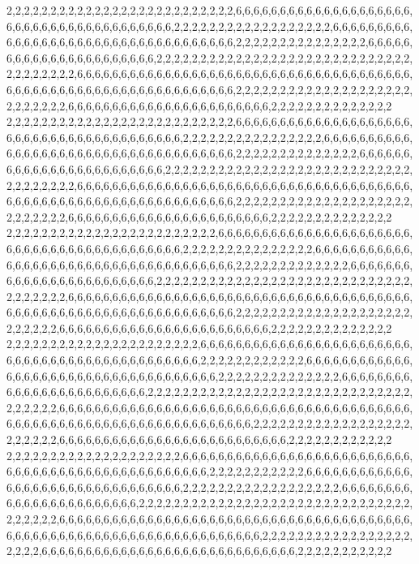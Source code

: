2,2,2,2,2,2,2,2,2,2,2,2,2,2,2,2,2,2,2,2,2,2,2,2,2,2,6,6,6,6,6,6,6,6,6,6,6,6,6,6,6,6,6,6,6,6,6,6,6,6,6,6,6,6,6,6,6,6,6,6,6,6,6,6,6,2,2,2,2,2,2,2,2,2,2,2,2,2,2,2,2,2,2,6,6,6,6,6,6,6,6,6,6,6,6,6,6,6,6,6,6,6,6,6,6,6,6,6,6,6,6,6,6,6,6,6,6,6,2,2,2,2,2,2,2,2,2,2,2,2,2,2,2,6,6,6,6,6,6,6,6,6,6,6,6,6,6,6,6,6,6,6,6,6,6,2,2,2,2,2,2,2,2,2,2,2,2,2,2,2,2,2,2,2,2,2,2,2,2,2,2,2,2,2,2,2,2,2,2,2,2,2,6,6,6,6,6,6,6,6,6,6,6,6,6,6,6,6,6,6,6,6,6,6,6,6,6,6,6,6,6,6,6,6,6,6,6,6,6,6,6,6,6,6,6,6,6,6,6,6,6,6,6,6,6,6,6,6,6,6,6,6,6,6,6,6,2,2,2,2,2,2,2,2,2,2,2,2,2,2,2,2,2,2,2,2,2,2,2,2,2,2,2,6,6,6,6,6,6,6,6,6,6,6,6,6,6,6,6,6,6,6,6,6,6,6,2,2,2,2,2,2,2,2,2,2,2,2,2,2
2,2,2,2,2,2,2,2,2,2,2,2,2,2,2,2,2,2,2,2,2,2,2,2,2,2,6,6,6,6,6,6,6,6,6,6,6,6,6,6,6,6,6,6,6,6,6,6,6,6,6,6,6,6,6,6,6,6,6,6,6,6,6,6,6,6,2,2,2,2,2,2,2,2,2,2,2,2,2,2,2,2,6,6,6,6,6,6,6,6,6,6,6,6,6,6,6,6,6,6,6,6,6,6,6,6,6,6,6,6,6,6,6,6,6,6,6,6,2,2,2,2,2,2,2,2,2,2,2,2,2,2,6,6,6,6,6,6,6,6,6,6,6,6,6,6,6,6,6,6,6,6,6,6,6,6,2,2,2,2,2,2,2,2,2,2,2,2,2,2,2,2,2,2,2,2,2,2,2,2,2,2,2,2,2,2,2,2,2,2,2,2,6,6,6,6,6,6,6,6,6,6,6,6,6,6,6,6,6,6,6,6,6,6,6,6,6,6,6,6,6,6,6,6,6,6,6,6,6,6,6,6,6,6,6,6,6,6,6,6,6,6,6,6,6,6,6,6,6,6,6,6,6,6,6,6,2,2,2,2,2,2,2,2,2,2,2,2,2,2,2,2,2,2,2,2,2,2,2,2,2,2,2,6,6,6,6,6,6,6,6,6,6,6,6,6,6,6,6,6,6,6,6,6,6,6,2,2,2,2,2,2,2,2,2,2,2,2,2,2
2,2,2,2,2,2,2,2,2,2,2,2,2,2,2,2,2,2,2,2,2,2,2,2,6,6,6,6,6,6,6,6,6,6,6,6,6,6,6,6,6,6,6,6,6,6,6,6,6,6,6,6,6,6,6,6,6,6,6,6,6,6,6,6,6,6,2,2,2,2,2,2,2,2,2,2,2,2,2,2,2,6,6,6,6,6,6,6,6,6,6,6,6,6,6,6,6,6,6,6,6,6,6,6,6,6,6,6,6,6,6,6,6,6,6,6,6,6,2,2,2,2,2,2,2,2,2,2,2,2,2,6,6,6,6,6,6,6,6,6,6,6,6,6,6,6,6,6,6,6,6,6,6,6,6,2,2,2,2,2,2,2,2,2,2,2,2,2,2,2,2,2,2,2,2,2,2,2,2,2,2,2,2,2,2,2,2,2,2,2,2,6,6,6,6,6,6,6,6,6,6,6,6,6,6,6,6,6,6,6,6,6,6,6,6,6,6,6,6,6,6,6,6,6,6,6,6,6,6,6,6,6,6,6,6,6,6,6,6,6,6,6,6,6,6,6,6,6,6,6,6,6,6,6,6,6,2,2,2,2,2,2,2,2,2,2,2,2,2,2,2,2,2,2,2,2,2,2,2,2,2,2,6,6,6,6,6,6,6,6,6,6,6,6,6,6,6,6,6,6,6,6,6,6,6,6,2,2,2,2,2,2,2,2,2,2,2,2,2,2
2,2,2,2,2,2,2,2,2,2,2,2,2,2,2,2,2,2,2,2,2,2,6,6,6,6,6,6,6,6,6,6,6,6,6,6,6,6,6,6,6,6,6,6,6,6,6,6,6,6,6,6,6,6,6,6,6,6,6,6,6,6,6,6,6,6,6,6,2,2,2,2,2,2,2,2,2,2,2,2,6,6,6,6,6,6,6,6,6,6,6,6,6,6,6,6,6,6,6,6,6,6,6,6,6,6,6,6,6,6,6,6,6,6,6,6,2,2,2,2,2,2,2,2,2,2,2,2,2,2,6,6,6,6,6,6,6,6,6,6,6,6,6,6,6,6,6,6,6,6,6,6,6,6,2,2,2,2,2,2,2,2,2,2,2,2,2,2,2,2,2,2,2,2,2,2,2,2,2,2,2,2,2,2,2,2,2,2,2,2,6,6,6,6,6,6,6,6,6,6,6,6,6,6,6,6,6,6,6,6,6,6,6,6,6,6,6,6,6,6,6,6,6,6,6,6,6,6,6,6,6,6,6,6,6,6,6,6,6,6,6,6,6,6,6,6,6,6,6,6,6,6,6,6,6,6,6,6,2,2,2,2,2,2,2,2,2,2,2,2,2,2,2,2,2,2,2,2,2,2,2,2,6,6,6,6,6,6,6,6,6,6,6,6,6,6,6,6,6,6,6,6,6,6,6,6,6,6,2,2,2,2,2,2,2,2,2,2,2,2
2,2,2,2,2,2,2,2,2,2,2,2,2,2,2,2,2,2,2,2,6,6,6,6,6,6,6,6,6,6,6,6,6,6,6,6,6,6,6,6,6,6,6,6,6,6,6,6,6,6,6,6,6,6,6,6,6,6,6,6,6,6,6,6,6,6,6,6,6,2,2,2,2,2,2,2,2,2,2,2,6,6,6,6,6,6,6,6,6,6,6,6,6,6,6,6,6,6,6,6,6,6,6,6,6,6,6,6,6,6,6,6,2,2,2,2,2,2,2,2,2,2,2,2,2,2,2,2,2,2,6,6,6,6,6,6,6,6,6,6,6,6,6,6,6,6,6,6,6,6,6,6,6,2,2,2,2,2,2,2,2,2,2,2,2,2,2,2,2,2,2,2,2,2,2,2,2,2,2,2,2,2,2,2,2,2,2,2,2,2,6,6,6,6,6,6,6,6,6,6,6,6,6,6,6,6,6,6,6,6,6,6,6,6,6,6,6,6,6,6,6,6,6,6,6,6,6,6,6,6,6,6,6,6,6,6,6,6,6,6,6,6,6,6,6,6,6,6,6,6,6,6,6,6,6,6,6,6,6,2,2,2,2,2,2,2,2,2,2,2,2,2,2,2,2,2,2,2,2,2,6,6,6,6,6,6,6,6,6,6,6,6,6,6,6,6,6,6,6,6,6,6,6,6,6,6,6,6,6,2,2,2,2,2,2,2,2,2,2,2
